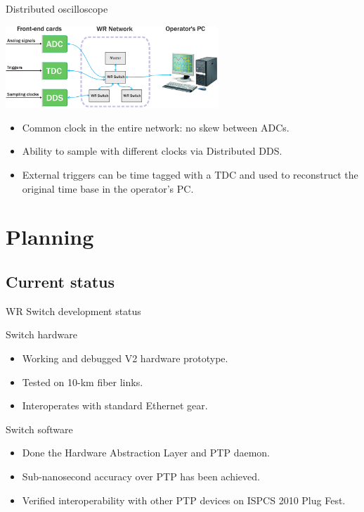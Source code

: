 \documentclass[compress,red]{beamer}
\begin{document}
\begin{frame}{Distributed oscilloscope}
  \begin{center}
    \includegraphics[width=8cm]{../../figures/applications/distr_oscill}
    \end{center}
    \begin{block}{}
      \begin{itemize}
      \item Common clock in the entire network: no skew between ADCs.
      \item Ability to sample with different clocks via Distributed DDS.
      \item External triggers can be time tagged with a TDC and used to reconstruct the original time base in the operator's PC.
      \end{itemize}
    \end{block}
\end{frame}



\section{Planning}

\subsection{Current status}

\begin{frame}{WR Switch development status}
	\begin{block}{Switch hardware}
          \begin{itemize}
            \item Working and debugged V2 hardware prototype.
            \item Tested on 10-km fiber links.
            \item Interoperates with standard Ethernet gear.
            \end{itemize}
            \end{block}

	\begin{block}{Switch software}
          \begin{itemize}
            \item Done the Hardware Abstraction Layer and PTP daemon. 
            \item Sub-nanosecond accuracy over PTP has been achieved.
            \item Verified interoperability with other PTP devices on ISPCS 2010 Plug Fest.
            \end{itemize}
          \end{block}
\end{frame}
\end{document}
